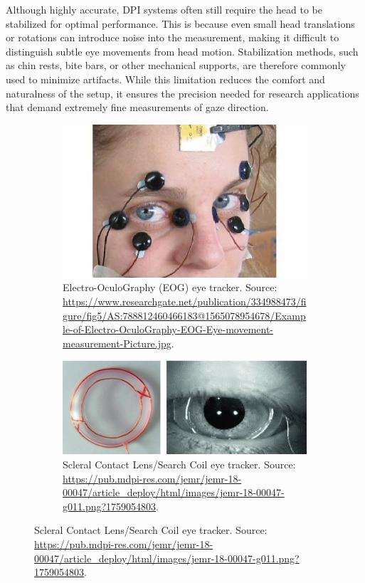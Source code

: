 \documentclass[12pt]{report}
\begin{document}
Although highly accurate, DPI systems often still require the head to be stabilized for optimal performance. 
This is because even small head translations or rotations can introduce noise into the measurement, making it difficult to distinguish subtle eye movements from head motion. Stabilization methods, such as chin rests, bite bars, or other mechanical supports, are therefore commonly used to minimize artifacts.
While this limitation reduces the comfort and naturalness of the setup, it ensures the precision needed for research applications that demand extremely fine measurements of gaze direction.

\begin{figure}[ht]
    \centering
    \begin{subfigure}[b]{0.45\textwidth}
        \centering
        \includegraphics[width=1\textwidth,height=0.6\textwidth]{Images/Theory/eog.png}
        \caption{Electro-OculoGraphy (EOG) eye tracker. Source: \url{https://www.researchgate.net/publication/334988473/figure/fig5/AS:788812460466183@1565078954678/Example-of-Electro-OculoGraphy-EOG-Eye-movement-measurement-Picture.jpg}.}
        \label{fig:eog}
    \end{subfigure}
    \hfill
    \begin{subfigure}[b]{0.45\textwidth}
        \centering
        \includegraphics[width=1\textwidth,height=0.6\textwidth]{Images/Theory/coil.png}
        \caption{Scleral Contact Lens/Search Coil eye tracker. Source: \url{https://pub.mdpi-res.com/jemr/jemr-18-00047/article_deploy/html/images/jemr-18-00047-g011.png?1759054803}.}
        \label{fig:coil}
    \end{subfigure}
    

\end{figure}
\end{document}
